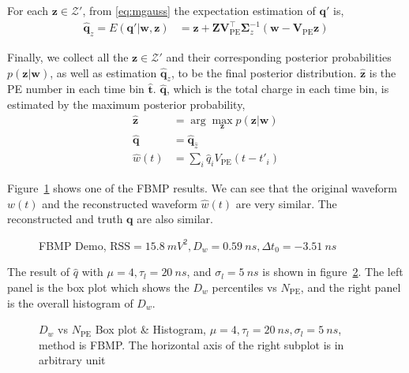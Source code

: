 For each $\bm{z} \in \mathcal{Z}'$, from \eqref{eq:mgauss} the expectation estimation of $\bm{q}'$ is, 
\begin{align}
    \hat{\bm{q}}_z = E(\bm{q}'|\bm{w},\bm{z}) &= \bm{z} + \bm{Z}\bm{V}_\mathrm{PE}^\intercal\bm{\Sigma}_z^{-1}(\bm{w}-\bm{V}_\mathrm{PE}\bm{z})
    \label{eq:fbmpcharge}
\end{align}

Finally, we collect all the $\bm{z} \in \mathcal{Z}'$ and their corresponding posterior probabilities $p(\bm{z}|\bm{w})$, as well as estimation $\hat{\bm{q}}_z$, to be the final posterior distribution. $\hat{\bm{z}}$ is the PE number in each time bin $\hat{\bm{t}}$. $\hat{\bm{q}}$, which is the total charge in each time bin, is estimated by the maximum posterior probability, 
\begin{equation}
    \begin{aligned}
        \label{eq:zposterior}
        \hat{\bm{z}} &= \arg \underset{\bm{z}}{\max} p(\bm{z}|\bm{w}) \\
        \hat{\bm{q}} &= \hat{\bm{q}}_{\hat{z}} \\
        \hat{w}(t) &= \sum_{i} \hat{q}_i V_\mathrm{PE}(t-t'_i)
    \end{aligned}
\end{equation}

Figure~\ref{fig:fbmp} shows one of the FBMP results. We can see that the original waveform $w(t)$ and the reconstructed waveform $\hat{w}(t)$ are very similar. The reconstructed and truth $\bm{q}$ are also similar. 

\begin{figure}[H]
    \centering
    \resizebox{0.6\textwidth}{!}{}
    \caption{\label{fig:fbmp} FBMP Demo, $\mathrm{RSS}=\SI{15.8}{mV^2},D_w=\SI{0.59}{ns},\Delta{t_0}=\SI{-3.51}{ns}$}
\end{figure}

The result of $\hat{q}$ with $\mu=4, \tau_l=\SI{20}{ns}$, and $\sigma_l=\SI{5}{ns}$ is shown in figure~\ref{fig:fbmp-npe}. The left panel is the box plot which shows the $D_w$ percentiles vs $N_{\mathrm{PE}}$, and the right panel is the overall histogram of $D_w$. 

\begin{figure}[H]
    \centering
    \resizebox{0.5\textwidth}{!}{}
    \caption{\label{fig:fbmp-npe} $D_w$ vs $N_{\mathrm{PE}}$ Box plot \& Histogram, $\mu=4, \tau_l=\SI{20}{ns}, \sigma_l=\SI{5}{ns}$, method is FBMP. The horizontal axis of the right subplot is in arbitrary unit}
\end{figure}

